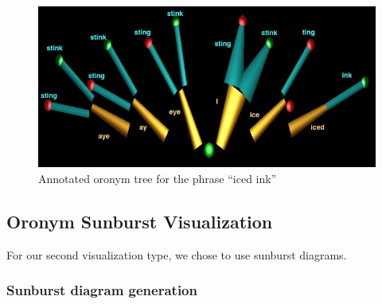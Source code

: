 \begin{figure}[ht]
\begin{center}
\includegraphics[width=\textwidth]{OronymTree_blackbg_IcedInk_annotated.jpg}
\captionfonts
\caption[Annotated oronym tree for the phrase iced ink]{Annotated oronym tree for the phrase ``iced ink''}
\label{fig:oronymTree:treeIcedInkAnnotated}
\end{center}
\end{figure}










\subsection{Oronym Sunburst Visualization}
\label{subsection:oronymSunburstVisualization}

For our second visualization type, we chose to use sunburst diagrams.  


\subsubsection{Sunburst diagram generation}
\label{subsection:oronymsunburst:sunburstDiagramGeneration}


